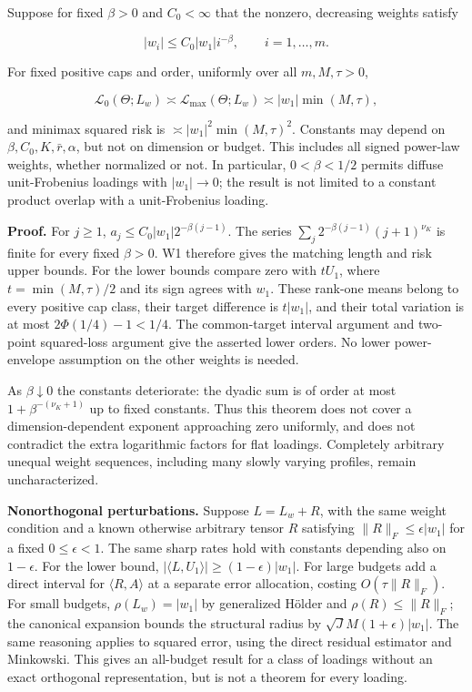 Suppose for fixed \(\beta>0\) and \(C_0<\infty\) that the nonzero,
decreasing weights satisfy

\[|w_i|\le C_0|w_1|i^{-\beta},\qquad i=1,\ldots,m.\]

For fixed positive caps and order, uniformly over all \(m,M,\tau>0\),

\[\mathcal L_0(\Theta;L_w)\asymp\mathcal L_{\max}(\Theta;L_w)
\asymp |w_1|\min(M,\tau),\]

and minimax squared risk is \(\asymp |w_1|^2\min(M,\tau)^2\). Constants
may depend on \(\beta,C_0,K,\bar r,\alpha\), but not on dimension or
budget. This includes all signed power-law weights, whether normalized
or not. In particular, \(0<\beta<1/2\) permits diffuse unit-Frobenius
loadings with \(|w_1|\to0\); the result is not limited to a constant
product overlap with a unit-Frobenius loading.

\textbf{Proof.} For \(j\ge1\), \(a_j\le C_0|w_1|2^{-\beta(j-1)}\). The
series \(\sum_j2^{-\beta(j-1)}(j+1)^{\nu_K}\) is finite for every fixed
\(\beta>0\). W1 therefore gives the matching length and risk upper
bounds. For the lower bounds compare zero with \(tU_1\), where
\(t=\min(M,\tau)/2\) and its sign agrees with \(w_1\). These rank-one
means belong to every positive cap class, their target difference is
\(t|w_1|\), and their total variation is at most \(2\Phi(1/4)-1<1/4\).
The common-target interval argument and two-point squared-loss argument
give the asserted lower orders. No lower power-envelope assumption on
the other weights is needed.

As \(\beta\downarrow0\) the constants deteriorate: the dyadic sum is of
order at most \(1+\beta^{-(\nu_K+1)}\) up to fixed constants. Thus this
theorem does not cover a dimension-dependent exponent approaching zero
uniformly, and does not contradict the extra logarithmic factors for
flat loadings. Completely arbitrary unequal weight sequences, including
many slowly varying profiles, remain uncharacterized.

\textbf{Nonorthogonal perturbations.} Suppose \(L=L_w+R\), with the same
weight condition and a known otherwise arbitrary tensor \(R\) satisfying
\(\|R\|_F\le\epsilon|w_1|\) for a fixed \(0\le\epsilon<1\). The same
sharp rates hold with constants depending also on \(1-\epsilon\). For
the lower bound, \(|\langle L,U_1\rangle|\ge(1-\epsilon)|w_1|\). For
large budgets add a direct interval for \(\langle R,A\rangle\) at a
separate error allocation, costing \(O(\tau\|R\|_F)\). For small
budgets, \(\rho(L_w)=|w_1|\) by generalized Hölder and
\(\rho(R)\le\|R\|_F\); the canonical expansion bounds the structural
radius by \(\sqrt J M(1+\epsilon)|w_1|\). The same reasoning applies to
squared error, using the direct residual estimator and Minkowski. This
gives an all-budget result for a class of loadings without an exact
orthogonal representation, but is not a theorem for every loading.

